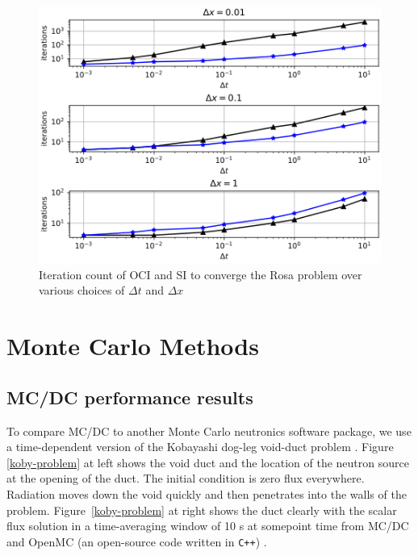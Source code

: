 \begin{figure}[h!]
    \centering
    \includegraphics[width=.5\textwidth]{figures/results/time_desc.png}
    \caption{Iteration count of OCI and SI to converge the Rosa problem over various choices of $\Delta t$ and $\Delta x$}
    \label{fig:time_desc}
\end{figure}

\section{Monte Carlo Methods}

\subsection{MC/DC performance results}

To compare MC/DC to another Monte Carlo neutronics software package, we use a time-dependent version of the Kobayashi dog-leg void-duct problem \cite{Kobayashi2001, variansyah_mc23_mcdc}.
Figure \ref{koby-problem} at left shows the void duct and the location of the neutron source at the opening of the duct.
The initial condition is zero flux everywhere.
Radiation moves down the void quickly and then penetrates into the walls of the problem.
Figure~\ref{koby-problem} at right shows the duct clearly with the scalar flux solution in a time-averaging window of 10 s at somepoint time from MC/DC and OpenMC \cite{romano_openmc_nodate} (an open-source code written in \texttt{C++}) .

